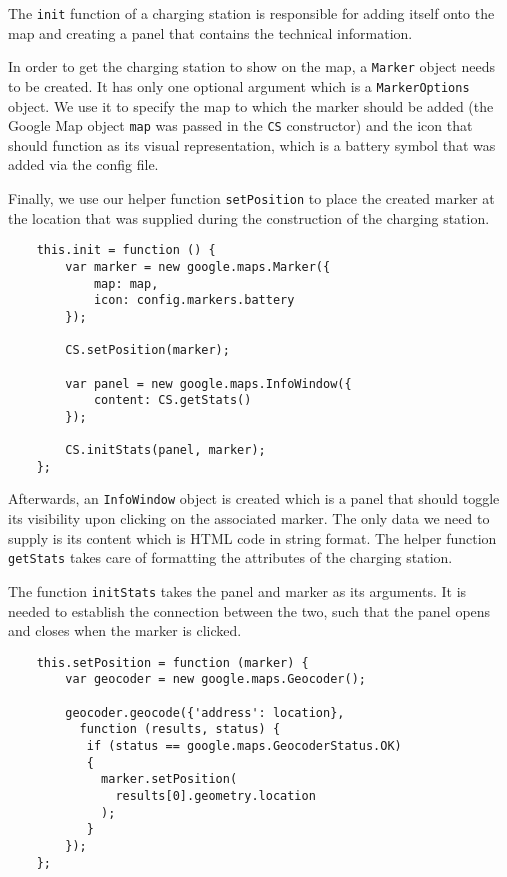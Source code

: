 The \texttt{init} function of a charging station is responsible for adding itself onto the map and creating a panel that contains the technical information.

In order to get the charging station to show on the map, a \texttt{Marker} object needs to be created. It has only one optional argument which is a \texttt{MarkerOptions} object. We use it to specify the map to which the marker should be added (the Google Map object \texttt{map} was passed in the \texttt{CS} constructor) and the icon that should function as its visual representation, which is a battery symbol that was added via the config file.

Finally, we use our helper function \texttt{setPosition} to place the created marker at the location that was supplied during the construction of the charging station.

\begin{verbatim}
    this.init = function () {
        var marker = new google.maps.Marker({
            map: map,
            icon: config.markers.battery
        });

        CS.setPosition(marker);

        var panel = new google.maps.InfoWindow({
            content: CS.getStats()
        });

        CS.initStats(panel, marker);
    };
\end{verbatim}

Afterwards, an \texttt{InfoWindow} object is created which is a panel that should toggle its visibility upon clicking on the associated marker. The only data we need to supply is its content which is HTML code in string format. The helper function \texttt{getStats} takes care of formatting the attributes of the charging station.

The function \texttt{initStats} takes the panel and marker as its arguments. It is needed to establish the connection between the two, such that the panel opens and closes when the marker is clicked.

\begin{verbatim}
    this.setPosition = function (marker) {
        var geocoder = new google.maps.Geocoder();

        geocoder.geocode({'address': location},
          function (results, status) {
           if (status == google.maps.GeocoderStatus.OK)
           {
             marker.setPosition(
               results[0].geometry.location
             );
           }
        });
    };
\end{verbatim}

